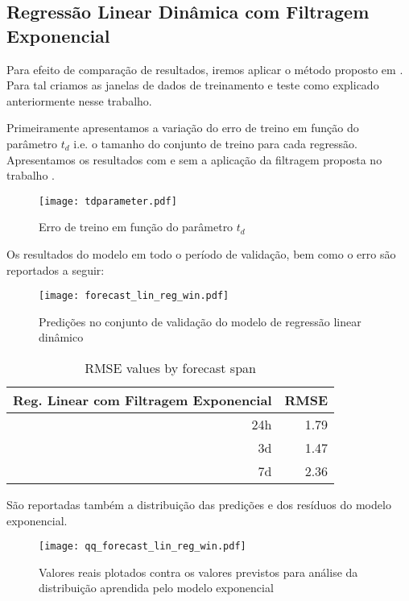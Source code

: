 \subsection{Regressão Linear Dinâmica com Filtragem Exponencial}

Para efeito de comparação de resultados, iremos aplicar o método proposto em
\citep{grecialin}. Para tal criamos as janelas de dados de treinamento e teste
como explicado anteriormente nesse trabalho. 

Primeiramente apresentamos a variação do erro de treino em
função do parâmetro $t_d$ i.e. o tamanho do conjunto de treino para cada
regressão. Apresentamos os resultados com e sem a aplicação da filtragem
proposta no trabalho \citep{grecialin}.

\begin{figure}[H]
  \centering
  \texttt{[image: tdparameter.pdf]}
  \caption{Erro de treino em função do parâmetro $t_d$}
  \label{fig:tdparam}
\end{figure}

Os resultados do modelo em todo o período de validação, bem como o erro são
reportados a seguir:

\begin{figure}[H]
  \centering
  \texttt{[image: forecast\_lin\_reg\_win.pdf]}
  \caption{Predições no conjunto de validação do modelo de regressão linear dinâmico}
  \label{fig:tdparam}
\end{figure}

\begin{center}
  \begin{table}[htbp]
    \caption{RMSE values by forecast span}
    \centering
    \begin{tabular}{rr}
      \hline
      Reg. Linear com Filtragem Exponencial & RMSE\\
      \hline
      24h & 1.79 \\ 
      3d & 1.47\\
      7d & 2.36\\
    \end{tabular}

    \label{tb:rmse_exp}
  \end{table}
\end{center}
São reportadas também a distribuição das predições e dos resíduos do modelo exponencial.

\begin{figure}[H]
  \label{fig:distr_exp}
  \centering
  \texttt{[image: qq\_forecast\_lin\_reg\_win.pdf]} \hfill
  \caption{Valores reais plotados contra os valores previstos para análise da
    distribuição aprendida pelo modelo exponencial} 
\end{figure}


